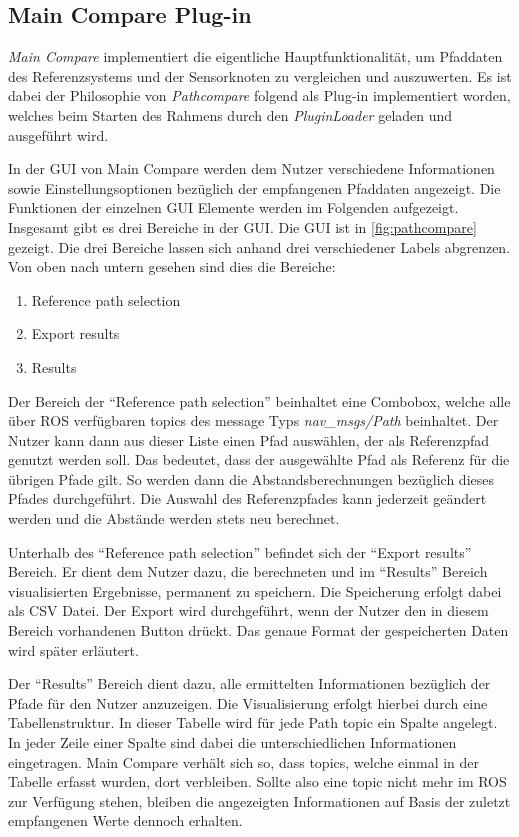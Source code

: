 \subsection{Main Compare Plug-in}
\label{sub:maincompare}


\textit{Main Compare} implementiert die eigentliche Hauptfunktionalität, um Pfaddaten des
Referenzsystems und der Sensorknoten zu vergleichen und auszuwerten. 
Es ist dabei der Philosophie von \textit{Pathcompare} folgend als Plug-in
implementiert worden, welches beim Starten des Rahmens durch den
\textit{PluginLoader} geladen und ausgeführt wird.

In der GUI von Main Compare werden dem Nutzer verschiedene Informationen sowie
Einstellungsoptionen bezüglich der
empfangenen Pfaddaten angezeigt. Die Funktionen der einzelnen GUI Elemente
werden im Folgenden aufgezeigt.
Insgesamt gibt es drei Bereiche in der GUI. Die GUI ist in
\autoref{fig:pathcompare} gezeigt. Die drei Bereiche lassen sich anhand drei
verschiedener Labels abgrenzen. Von oben nach untern gesehen sind
dies die Bereiche:

\begin{enumerate}
  \item Reference path selection
  \item Export results
  \item Results
\end{enumerate}


Der Bereich der ``Reference path selection'' beinhaltet eine Combobox, welche
alle über ROS verfügbaren topics des message Typs \textit{nav\_msgs/Path} beinhaltet.
Der Nutzer kann dann aus dieser Liste einen Pfad auswählen, der als
Referenzpfad genutzt werden soll. Das bedeutet, dass der ausgewählte Pfad als
Referenz für die übrigen Pfade gilt. So werden dann die Abstandsberechnungen
bezüglich dieses Pfades durchgeführt. Die Auswahl des Referenzpfades kann
jederzeit geändert werden und die Abstände werden stets neu berechnet.

Unterhalb des ``Reference path selection'' befindet sich der ``Export
results'' Bereich. Er dient dem Nutzer dazu, die berechneten und
im ``Results'' Bereich visualisierten Ergebnisse, permanent zu speichern.
Die Speicherung erfolgt dabei als \gls{CSV} Datei. Der Export wird
durchgeführt, wenn der Nutzer den in diesem Bereich vorhandenen Button drückt. 
Das genaue Format der gespeicherten Daten wird später erläutert.

Der ``Results'' Bereich dient dazu, alle ermittelten Informationen bezüglich der
Pfade für den Nutzer anzuzeigen. Die Visualisierung erfolgt hierbei durch eine
Tabellenstruktur. In dieser Tabelle wird für jede Path topic ein Spalte
angelegt.
In jeder Zeile einer Spalte sind dabei die unterschiedlichen
Informationen eingetragen.
Main Compare verhält sich so, dass topics, welche einmal in
der Tabelle erfasst wurden, dort verbleiben. Sollte also eine topic nicht
mehr im ROS zur Verfügung stehen, bleiben die angezeigten Informationen auf
Basis der zuletzt empfangenen Werte dennoch erhalten. 

